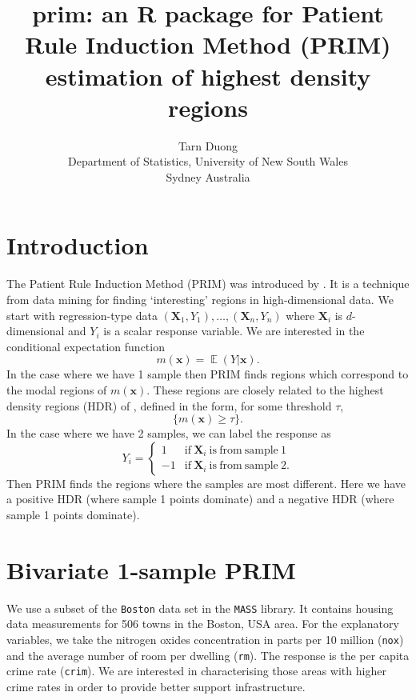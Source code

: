 \documentclass[a4paper,11pt]{article}
\title{prim: an R package for Patient Rule Induction Method (PRIM) estimation of highest density regions}
\author{Tarn Duong \\ Department of Statistics, University of New South Wales \\ Sydney Australia}
\renewcommand{\vec}[1]{\boldsymbol{#1}}
\DeclareMathOperator{\E}{\boldsymbol{\mathbb{E}}}
\def\vecx{\vec{x}}
\def\vecX{\vec{X}}
\begin{document}
\maketitle

\section{Introduction}

The Patient Rule Induction Method (PRIM) was introduced
by \citet*{friedman99}. It is a technique from data mining 
for finding `interesting' regions in high-dimensional data. 
We start with regression-type data $(\vecX_1, Y_1), \dots, (\vecX_n, Y_n)$
where $\vecX_i$ is $d$-dimensional and $Y_i$ is a scalar response variable.
We are interested in the conditional expectation function
$$
m(\vecx) = \E (Y | \vecx).    
$$
In the case where we have 1 sample then PRIM
finds regions which correspond to the modal regions of $m(\vecx)$. 
These regions are closely related to the highest density regions (HDR) of 
\citet*{hyndman96}, defined in the form, for some threshold $\tau$,
$$
\lbrace m(\vecx) \geq \tau \rbrace.
$$
In the case where we have 2 samples, we can label the response as 
$$Y_i = \begin{cases} 1 & \mathrm{if} \ \vecX_i \ \mathrm{is \ from \ sample\ 1} \\
 -1 & \mathrm{if} \ \vecX_i \ \mathrm{is \ from \ sample\ 2.}
\end{cases}
$$
Then PRIM finds the regions where the samples are most different. 
Here we have a positive HDR (where sample 1 points dominate)
and a negative HDR (where sample 1 points dominate).

 


\section{Bivariate 1-sample PRIM}

We use a subset of the \texttt{Boston} 
data set in the \texttt{MASS} library. It contains
housing data measurements for 506 towns in the Boston, USA area.
For the explanatory variables, we
take the nitrogen oxides concentration in parts per 10 million (\texttt{nox}) 
and the average number of room per dwelling (\texttt{rm}). The 
response is the per capita crime rate (\texttt{crim}). 
We are interested in characterising those areas with higher crime rates
in order to provide better support infrastructure.
\end{document}
